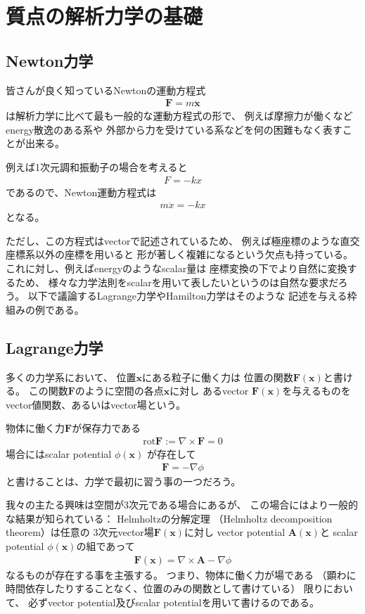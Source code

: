 \section{質点の解析力学の基礎}

\subsection{Newton力学}

皆さんが良く知っているNewtonの運動方程式
\begin{align}
  \bm{F} = m\ddot{\bm{x}}
\end{align}
は解析力学に比べて最も一般的な運動方程式の形で、
例えば摩擦力が働くなどenergy散逸のある系や
外部から力を受けている系などを何の困難もなく表すことが出来る。

例えば1次元調和振動子の場合を考えると
\begin{align}
  F = -k x
\end{align}
であるので、Newton運動方程式は
\begin{align}
  m\ddot{x} = - k x
\end{align}
となる。

ただし、この方程式はvectorで記述されているため、
例えば極座標のような直交座標系以外の座標を用いると
形が著しく複雑になるという欠点も持っている。
これに対し、例えばenergyのようなscalar量は
座標変換の下でより自然に変換するため、
様々な力学法則をscalarを用いて表したいというのは自然な要求だろう。
以下で議論するLagrange力学やHamilton力学はそのような
記述を与える枠組みの例である。

\subsection{Lagrange力学}

多くの力学系において、
位置$\bm{x}$にある粒子に働く力は
位置の関数$\bm{F}(\bm{x})$と書ける。
この関数$\bm{F}$のように空間の各点$\bm{x}$に対し
あるvector $\bm{F}(\bm{x})$を与えるものを
vector値関数、あるいはvector場という。

物体に働く力$\bm{F}$が保存力である
\begin{align}
  \mathrm{rot} \bm{F}
  :=
  \nabla \times \bm{F}
  = 0
\end{align}
場合にはscalar potential $\phi(\bm{x})$
が存在して
\begin{align}
  \bm{F} = -\nabla \phi
\end{align}
と書けることは、力学で最初に習う事の一つだろう。

我々の主たる興味は空間が3次元である場合にあるが、
この場合にはより一般的な結果が知られている：
Helmholtzの分解定理
（Helmholtz decomposition theorem）は任意の
3次元vector場$\bm{F}(\bm{x})$に対し
vector potential $\bm{A}(\bm{x})$と
scalar potential $\phi(\bm{x})$の組であって
\begin{align}
  \bm{F}(\bm{x}) = \nabla \times \bm{A} - \nabla \phi
\label{helmholtz decomposition theorem}
\end{align}
なるものが存在する事を主張する。
つまり、物体に働く力が場である
（顕わに時間依存したりすることなく、位置のみの関数として書けている）
限りにおいて、
必ずvector potential及びscalar potentialを用いて書けるのである。

